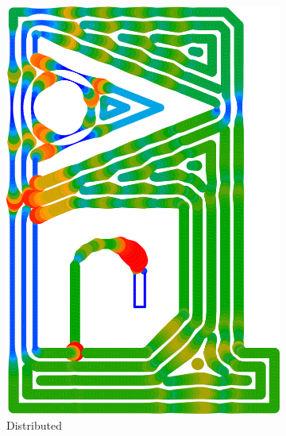 \begin{figure}
\begin{subfigure}{\figwidth}
\includegraphics[height=\figheight]{sources/validation/gMAT_example/TEST_Distributed_widths.png}
\caption{Distributed}\label{TEST_Distributed_accuracy}
\end{subfigure}
\begin{subfigure}{.04\columnwidth}\centering
\vspace{4cm}

\end{subfigure}
\end{figure}
